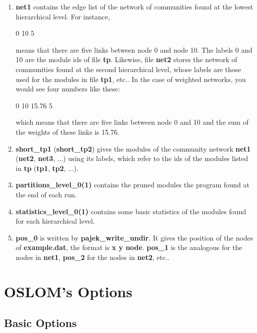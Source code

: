 \documentclass[11pt]{article}
\begin{document}
\begin{enumerate}
  \item \textbf{net1} contains the edge list of the network of
    communities found at the lowest hierarchical level. For instance,
  
0	10	5

  
  means that there are five links between node 0 and node 10. The
  labels 0 and 10
  are the module ids of file \textbf{tp}. 
Likewise, file  \textbf{net2} stores the network of communities found
at the second hierarchical level, whose labels are those used
for the modules in file \textbf{tp1}, etc.. In the case of weighted networks, you would see four numbers like these:
  
 0 10 15.76 5
 
which means that there are five links between node 0 and 10 and the sum of the weights of these links is 15.76.
     
  
  \item  \textbf{short\_tp1} ({\bf short\_tp2}) gives the modules of
    the community
    network \textbf{net1} ({\bf net2}, {\bf net3}, ...) using its
    labels, which refer to the ids of the modules listed in
    \textbf{tp} ({\bf tp1}, {\bf tp2}, ...).
     
  
  \item \textbf{partitions\_level\_0(1)}  contains the pruned modules the program found at the end of each run. 
  
  \item \textbf{statistics\_level\_0(1)}  contains some basic statistics of the modules found for each hierarchical level.

  
  \item \textbf{pos\_0} is written by \textbf{pajek\_write\_undir}. It
    gives the position of the nodes of \textbf{example.dat}, the
    format is \textbf{x y node}. \textbf{pos\_1} is the analogous for the
    nodes in \textbf{net1}, \textbf{pos\_2} for the nodes in
    \textbf{net2}, etc..
  
  
\end{enumerate}


\section{OSLOM's Options}


  \subsection{Basic Options}
\label{basic_op}
\end{document}
